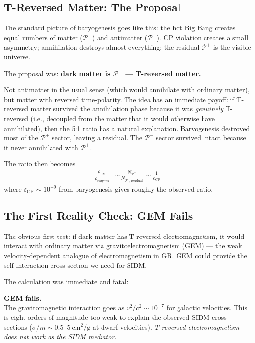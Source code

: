 \documentclass[12pt, a4paper]{article}
\begin{document}
\subsection{T-Reversed Matter: The Proposal}

The standard picture of baryogenesis goes like this: the hot Big Bang creates equal numbers of matter ($\mathcal{P}^+$) and antimatter ($\mathcal{P}^-$). CP violation creates a small asymmetry; annihilation destroys almost everything; the residual $\mathcal{P}^+$ is the visible universe.

The proposal was: \textbf{dark matter is $\mathcal{P}^-$ --- T-reversed matter.} 

Not antimatter in the usual sense (which would annihilate with ordinary matter), but matter with reversed time-polarity. The idea has an immediate payoff: if T-reversed matter survived the annihilation phase because it was \emph{genuinely} T-reversed (i.e., decoupled from the matter that it would otherwise have annihilated), then the 5:1 ratio has a natural explanation. Baryogenesis destroyed most of the $\mathcal{P}^+$ sector, leaving a residual. The $\mathcal{P}^-$ sector survived intact because it never annihilated with $\mathcal{P}^+$.

The ratio then becomes:
\begin{align}
  \frac{\rho_\text{DM}}{\rho_\text{baryons}} &\sim \frac{N_{\mathcal{P}^-}}{N_{\mathcal{P}^+, \text{residual}}} \sim \frac{1}{\varepsilon_\text{CP}}
\end{align}
where $\varepsilon_\text{CP} \sim 10^{-9}$ from baryogenesis gives roughly the observed ratio.

\subsection{The First Reality Check: GEM Fails}

The obvious first test: if dark matter has T-reversed electromagnetism, it would interact with ordinary matter via gravitoelectromagnetism (GEM) --- the weak velocity-dependent analogue of electromagnetism in GR. GEM could provide the self-interaction cross section we need for SIDM.

The calculation was immediate and fatal:

\begin{failbox}
\textbf{GEM fails.}\\
The gravitomagnetic interaction goes as $v^2/c^2 \sim 10^{-7}$ for galactic velocities.
This is eight orders of magnitude too weak to explain the observed SIDM cross sections
($\sigma/m \sim 0.5$--$5~\text{cm}^2/\text{g}$ at dwarf velocities).
\emph{T-reversed electromagnetism does not work as the SIDM mediator.}
\end{failbox}
\end{document}
